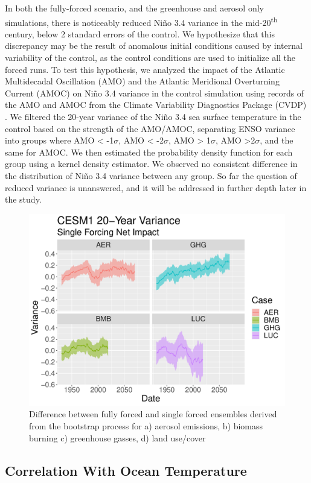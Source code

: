 \documentclass[11pt]{article}
\begin{document}
In both the fully-forced scenario, and the greenhouse and aerosol only simulations, there is noticeably reduced Niño 3.4 variance in the mid-20\textsuperscript{th} century, below 2 standard errors of the control. We hypothesize that this discrepancy may be the result of anomalous initial conditions caused by internal variability of the control, as the control conditions are used to initialize all the forced runs. To test this hypothesis, we analyzed the impact of the Atlantic Multidecadal Oscillation (AMO) and the Atlantic Meridional Overturning Current (AMOC) on Niño 3.4 variance in the control simulation using records of the AMO and AMOC from the Climate Variability Diagnostics Package (CVDP) \citep{phillips2014evaluating}. We filtered the 20-year variance of the Niño 3.4 sea surface temperature in the control based on the strength of the AMO/AMOC, separating ENSO variance into groups where AMO < -1\(\sigma\), AMO < -2\(\sigma\), AMO > 1\(\sigma\), AMO >2\(\sigma\), and the same for AMOC. We then estimated the probability density function for each group using a kernel density estimator. We observed no consistent difference in the distribution of Niño 3.4 variance between any group. So far the question of reduced variance is unanswered, and it will be addressed in further depth later in the study.

\begin{figure}
\centering
\includegraphics[width=.8\linewidth]{../../data/figures/cesm1_sf.pdf}
\caption{\label{fig:bootstrap_1}Difference between fully forced and single forced ensembles derived from the bootstrap process for a) aerosol emissions, b) biomass burning c) greenhouse gasses, d) land use/cover}
\end{figure}

\subsection{Correlation With Ocean Temperature}
\end{document}
